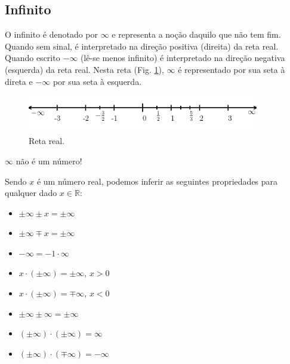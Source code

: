 \subsection{Infinito}

O infinito é denotado por $\infty$ e representa a noção daquilo que não tem fim. Quando sem sinal, é interpretado na direção positiva (direita) da reta real. Quando escrito $-\infty$ (lê-se menos infinito) é interpretado na direção negativa (esquerda) da reta real. Nesta reta (Fig. \ref{fig:conjreal_retareal_infty}), $\infty$ é representado por sua seta à direta e $-\infty$ por sua seta à esquerda.

\begin{figure}[H]
  \centering
  \includegraphics[width=0.9\textwidth]{./cap_numreal/dados/fig_retareal_infty/fig}
  \caption{Reta real.}
  \label{fig:conjreal_retareal_infty}
\end{figure}


\begin{obs}
  $\infty$ não é um número!
\end{obs}

Sendo $x$ é um número real, podemos inferir as seguintes propriedades para qualquer dado $x\in\mathbb{R}$:
\begin{itemize}
\item $\pm\infty \pm x = \pm\infty$ \\
\item $\pm\infty \mp x = \pm\infty$ \\
\item $-\infty = -1\cdot\infty$ \\
\item $x\cdot(\pm\infty) = \pm\infty$, $x>0$
\item $x\cdot(\pm\infty) = \mp\infty$, $x<0$
\item $\pm\infty \pm \infty = \pm\infty$ \\
\item $(\pm\infty)\cdot(\pm\infty) = \infty$ \\
\item $(\pm\infty)\cdot(\mp\infty) = -\infty$
\end{itemize}


